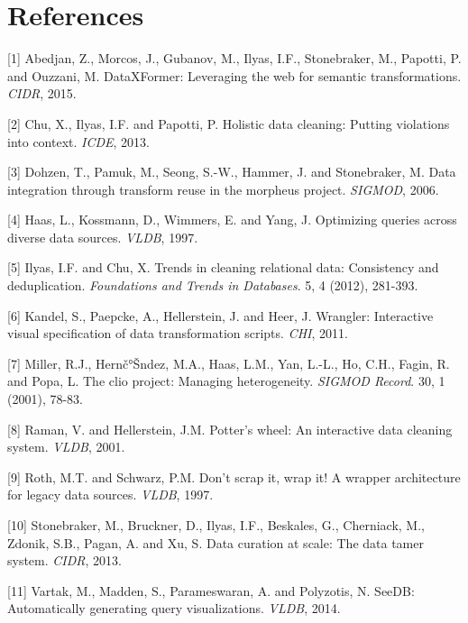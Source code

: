 \documentclass[b5paper,11pt,twoside,openright]{book}
\begin{document}
\section*{References}

\leavevmode\hypertarget{ref-dataxformer}{}%
{[}1{]} Abedjan, Z., Morcos, J., Gubanov, M., Ilyas, I.F., Stonebraker,
M., Papotti, P. and Ouzzani, M. DataXFormer: Leveraging the web for
semantic transformations. \emph{CIDR}, 2015.

\leavevmode\hypertarget{ref-fd-cleaning}{}%
{[}2{]} Chu, X., Ilyas, I.F. and Papotti, P. Holistic data cleaning:
Putting violations into context. \emph{ICDE}, 2013.

\leavevmode\hypertarget{ref-morpheus}{}%
{[}3{]} Dohzen, T., Pamuk, M., Seong, S.-W., Hammer, J. and Stonebraker,
M. Data integration through transform reuse in the morpheus project.
\emph{SIGMOD}, 2006.

\leavevmode\hypertarget{ref-garlic1}{}%
{[}4{]} Haas, L., Kossmann, D., Wimmers, E. and Yang, J. Optimizing
queries across diverse data sources. \emph{VLDB}, 1997.

\leavevmode\hypertarget{ref-fnt-cleaning}{}%
{[}5{]} Ilyas, I.F. and Chu, X. Trends in cleaning relational data:
Consistency and deduplication. \emph{Foundations and Trends in
  Databases}. 5, 4 (2012), 281-393.

\leavevmode\hypertarget{ref-wrangler}{}%
{[}6{]} Kandel, S., Paepcke, A., Hellerstein, J. and Heer, J. Wrangler:
Interactive visual specification of data transformation scripts.
\emph{CHI}, 2011.

\leavevmode\hypertarget{ref-clio}{}%
{[}7{]} Miller, R.J., Hernč°Šndez, M.A., Haas, L.M., Yan, L.-L., Ho, C.H.,
Fagin, R. and Popa, L. The clio project: Managing heterogeneity.
\emph{SIGMOD Record}. 30, 1 (2001), 78-83.

\leavevmode\hypertarget{ref-potterswheel}{}%
{[}8{]} Raman, V. and Hellerstein, J.M. Potter's wheel: An interactive
data cleaning system. \emph{VLDB}, 2001.

\leavevmode\hypertarget{ref-garlic2}{}%
{[}9{]} Roth, M.T. and Schwarz, P.M. Don't scrap it, wrap it! A wrapper
architecture for legacy data sources. \emph{VLDB}, 1997.

\leavevmode\hypertarget{ref-tamer}{}%
{[}10{]} Stonebraker, M., Bruckner, D., Ilyas, I.F., Beskales, G.,
Cherniack, M., Zdonik, S.B., Pagan, A. and Xu, S. Data curation at
scale: The data tamer system. \emph{CIDR}, 2013.

\leavevmode\hypertarget{ref-seedb}{}%
{[}11{]} Vartak, M., Madden, S., Parameswaran, A. and Polyzotis, N.
SeeDB: Automatically generating query visualizations. \emph{VLDB}, 2014.
\end{document}

